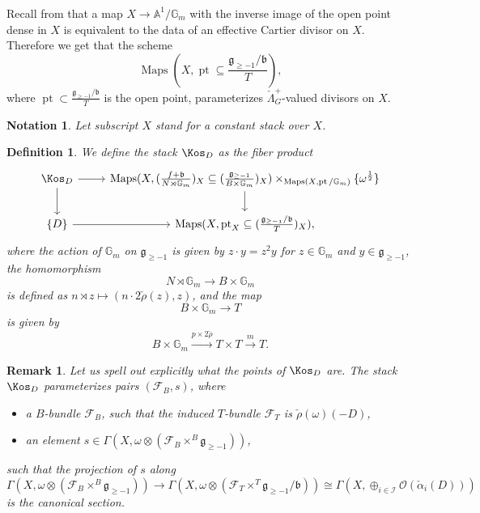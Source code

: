 \documentclass[9pt]{amsart}
\DeclareMathOperator{\pt}{{pt}}
\newcommand{\bA}{{\mathbb A}}
\newcommand{\bG}{{\mathbb G}}
\newcommand{\cF}{{\mathcal F}}
\newcommand{\cI}{{\mathcal I}}
\newcommand{\cO}{{\mathcal O}}
\DeclareMathOperator{\Maps}{{Maps}}
\newtheorem{df}[subsubsection]{Definition}
\newtheorem{rem}[subsubsection]{Remark}
\newtheorem{ntn}[subsubsection]{Notation}
\numberwithin{equation}{section}
\begin{document}
\subsubsection{} Recall from \cite[Lemma 2.7.2]{CPSI} that a map $X \rightarrow \bA^1/\bG_m$ with the inverse image of the open point dense in $X$ is equivalent to the data of an effective Cartier divisor on $X$. Therefore we get that the scheme $$\Maps(X, \pt \subseteq \frac{\mathfrak{g_{\geq -1}}/\mathfrak{b} }{T}),$$ where $\pt \subset  \frac{\mathfrak{g_{\geq -1}}/\mathfrak{b} }{T}$ is the open point,  parameterizes  $\check{\Lambda}_{G}^+$-valued divisors on $X$.

\begin{ntn}
	Let subscript $X$ stand for a constant stack over $X$.
\end{ntn}
 
\begin{df}
	We define the stack $\Kos_D$ as the fiber product 
		\[
	\begin{tikzcd}
	\Kos_D\ar[r, rightarrow, ""']\ar[d, rightarrow, ""']&   	\Maps(X, (\frac{f + \mathfrak{b}}{N \rtimes\bG_m})_X \subseteq (\frac{\mathfrak{g}_{\geq -1}}{B \times \bG_m})_X) \times_{\Maps(X, \pt/\bG_m) }\{ \omega^{\frac{1}{2}}\}\ar[d, rightarrow, ""']  \\
	\{D\}\ar[r, rightarrow, ""']&  \Maps(X, \pt_X \subseteq (\frac{\mathfrak{g_{\geq -1}}/\mathfrak{b} }{T})_X),
	\end{tikzcd}
	\]
	where the action of $\bG_m$ on $\mathfrak{g}_{\geq -1}$ is given by $z \cdot y = z^2y$ for $z \in \bG_m$ and $y \in \mathfrak{g}_{\geq -1}$, the homomorphism 
	$$N \rtimes\bG_m \rightarrow B \times \bG_m$$
	is defined as $n \rtimes z \mapsto (n \cdot 2\check{\rho}(z), z)$,
	and the map $$B \times \bG_m \rightarrow T$$ is given by $$B \times \bG_m \xrightarrow{p \times 2\check{\rho}} T \times T \xrightarrow{m} T.$$
\end{df}

\begin{rem}\label{kosD points}
	Let us spell out explicitly what the points of $\Kos_D$ are. The stack $\Kos_D$
	parameterizes pairs $(\cF_B, s)$, where
	\begin{itemize}
		\item a $B$-bundle $\cF_B$, such that the induced $T$-bundle $\cF_T$ is $\check{\rho}(\omega)(-D)$,
		\item an element $s \in \Gamma(X, \omega \otimes (\cF_B \times^B \mathfrak{g}_{\geq -1}))$,
	\end{itemize}
	 such that the projection of $s$ along $$\Gamma(X, \omega \otimes( \cF_B \times^B \mathfrak{g}_{\geq -1})) \rightarrow \Gamma(X, \omega \otimes (\cF_T \times^T \mathfrak{g}_{\geq -1}/\mathfrak{b})) \cong \Gamma(X, \oplus_{i \in \cI} \cO(\check{\alpha}_i(D)))$$
	is the canonical section. 
\end{rem}
\end{document}
